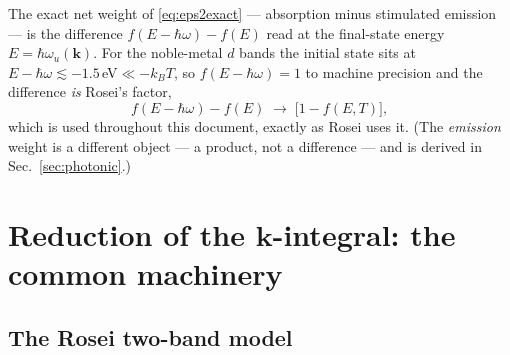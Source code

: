 \documentclass[11pt,a4paper]{article}
\numberwithin{equation}{section}
\begin{document}
The exact net weight of \eqref{eq:eps2exact} --- absorption minus
stimulated emission --- is the difference
${f}(E-{\hbar\omega})-{f}(E)$ read at the final-state energy
$E=\hbar\omega_u(\mathbf k)$.  For the noble-metal $d$ bands the
initial state sits at $E-{\hbar\omega}\lesssim-1.5\,$eV${}\ll-{k_B} T$, so
${f}(E-{\hbar\omega})=1$ to machine precision and the difference \emph{is}
Rosei's factor,
\begin{equation}
{f}(E-{\hbar\omega})-{f}(E)\;\longrightarrow\;\bigl[1-{f}(E,T)\bigr],
\label{eq:occup}
\end{equation}
which is used throughout this document, exactly as Rosei uses it.
(The \emph{emission} weight is a different object --- a product, not a
difference --- and is derived in Sec.~\ref{sec:photonic}.)

\section{Reduction of the $\mathbf{k}$-integral: the common machinery}
\label{sec:reduction}

\subsection{The Rosei two-band model}\label{sec:bands}
\end{document}
